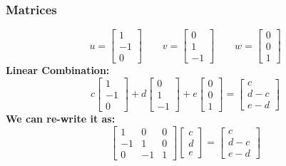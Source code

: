 \documentclass{beamer}
\newtheorem{Key points}{Key points}
\begin{document}
 \begin{frame}
   \frametitle{Matrices}
   \begin{equation*}
     u=\begin{bmatrix}
      1\\-1\\0
     \end{bmatrix}\qquad{}v=
     \begin{bmatrix}
       0\\1\\-1
     \end{bmatrix}\qquad{}w=
     \begin{bmatrix}
       0\\0\\1
     \end{bmatrix}
   \end{equation*}
\textbf{Linear Combination:}
\begin{equation*}
  c\begin{bmatrix}
      1\\-1\\0
     \end{bmatrix}+d
\begin{bmatrix}
       0\\1\\-1
     \end{bmatrix}
+e\begin{bmatrix}
       0\\0\\1
     \end{bmatrix}=
      \begin{bmatrix}
        c\\d-c\\e-d
      \end{bmatrix}
\end{equation*}
\textbf{We can re-write it as:}
\begin{equation*}
  \begin{bmatrix}
      1 & 0& 0\\
      -1 & 1 & 0\\
       0 & -1 & 1
     \end{bmatrix}
 \begin{bmatrix}
       c\\d\\e
     \end{bmatrix}=
       \begin{bmatrix}
        c\\d-c\\e-d
      \end{bmatrix}
    \end{equation*}
 \end{frame}
\end{document}
